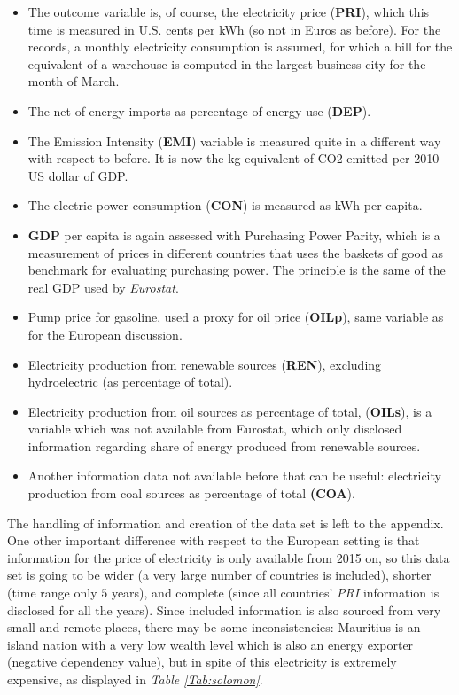 \documentclass[a4paper,12pt]{book}
\begin{document}
\begin{itemize}
\item The outcome variable is, of course, the electricity price (\textbf{PRI}), which this time is measured in U.S. cents per kWh (so not in Euros as before). For the records, a monthly electricity consumption is assumed, for which a bill for the equivalent of a warehouse is computed in the largest business city for the month of March. 
\item The net of energy imports as percentage of energy use (\textbf{DEP}).
\item The Emission Intensity (\textbf{EMI}) variable is measured quite in a different way with respect to before. It is now the kg equivalent of CO2 emitted per 2010 US dollar of GDP.
\item The electric power consumption (\textbf{CON}) is measured as kWh per capita.
\item \textbf{GDP} per capita is again assessed with Purchasing Power Parity, which is a measurement of prices in different countries that uses the baskets of good as benchmark for evaluating purchasing power. The principle is the same of the real GDP used by \textit{Eurostat}.
\item Pump price for gasoline, used a proxy for oil price (\textbf{OILp}), same variable as for the European discussion.
\item Electricity production from renewable sources (\textbf{REN}), excluding hydroelectric (as percentage of total).
\item Electricity production from oil sources as percentage of total, (\textbf{OILs}), is a variable which was not available from Eurostat, which only disclosed information regarding share of energy produced from renewable sources.
\item Another information data not available before that can be useful: electricity production from coal sources as percentage of total \textbf{(COA}).
\end{itemize}

The handling of information and creation of the data set is left to the appendix. One other important difference with respect to the European setting is that information for the price of electricity is only available from 2015 on, so this data set is going to be wider (a very large number of countries is included), shorter (time range only $5$ years), and complete (since all countries' \textit{PRI} information is disclosed for all the years). Since included information is also sourced from very small and remote places, there may be some inconsistencies: Mauritius is an island nation with a very low wealth level which is also an energy exporter (negative dependency value), but in spite of this electricity is extremely expensive, as displayed in \textit{Table \ref{Tab:solomon}}.
\end{document}
